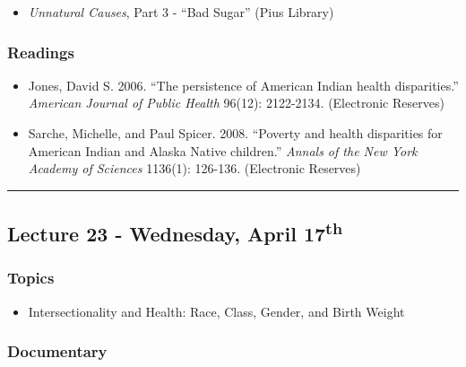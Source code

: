 \documentclass[]{book}
\providecommand{\tightlist}{%
  \setlength{\itemsep}{0pt}\setlength{\parskip}{0pt}}
\begin{document}
\begin{itemize}
\tightlist
\item
  \emph{Unnatural Causes}, Part 3 - ``Bad Sugar'' (Pius Library)
\end{itemize}

\hypertarget{readings-23}{%
\subsubsection*{Readings}\label{readings-23}}

\begin{itemize}
\tightlist
\item
  Jones, David S. 2006. ``The persistence of American Indian health disparities.'' \emph{American Journal of Public Health} 96(12): 2122-2134. (Electronic Reserves)
\item
  Sarche, Michelle, and Paul Spicer. 2008. ``Poverty and health disparities for American Indian and Alaska Native children.'' \emph{Annals of the New York Academy of Sciences} 1136(1): 126-136. (Electronic Reserves)
\end{itemize}

\begin{center}\rule{0.5\linewidth}{\linethickness}\end{center}

\hypertarget{lecture-23---wednesday-april-17th}{%
\subsection*{\texorpdfstring{Lecture 23 - Wednesday, April 17\textsuperscript{th}}{Lecture 23 - Wednesday, April 17th}}\label{lecture-23---wednesday-april-17th}}

\hypertarget{topics-26}{%
\subsubsection*{Topics}\label{topics-26}}

\begin{itemize}
\tightlist
\item
  Intersectionality and Health: Race, Class, Gender, and Birth Weight
\end{itemize}

\hypertarget{documentary-3}{%
\subsubsection*{Documentary}\label{documentary-3}}
\end{document}
